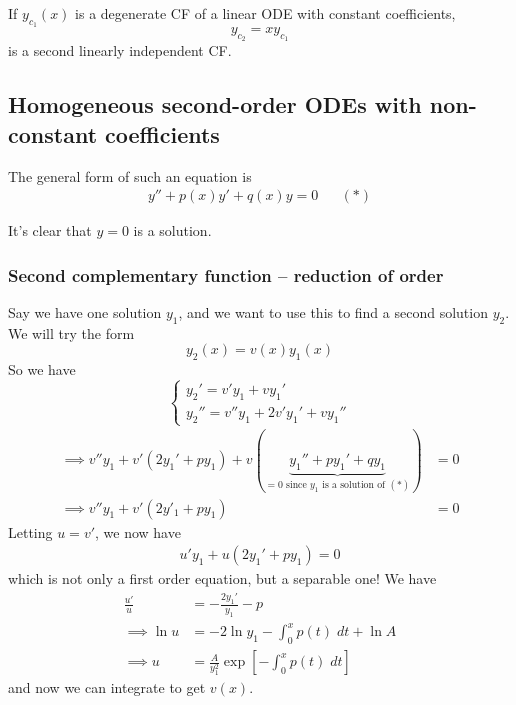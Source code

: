 \documentclass{../../template/note}
\begin{document}
    \begin{proposition}
        If \(y_{c_1}(x)\) is a degenerate CF of a linear ODE with constant coefficients,
        \[
            y_{c_2} = xy_{c_1}
        \]
        is a second linearly independent CF.
    \end{proposition}
    
    
    

    \subsection{Homogeneous second-order ODEs with non-constant coefficients}

    The general form of such an equation is
    \begin{align*}
        y'' + p(x)y' + q(x)y = 0 && (*)   
    \end{align*}

    It's clear that \(y = 0\) is a solution.

    \subsubsection{Second complementary function -- reduction of order}

    Say we have one solution \(y_1\), and we want to use this to find a second solution \(y_2\). We will try the form
    \[
        y_2(x) = v(x)y_1(x)
    \]
    So we have
    \[
        \begin{cases}
            y_2' = v'y_1 + vy_1' \\
            y_2'' = v''y_1 + 2v'y_1' + vy_1''
        \end{cases}
    \]
    \begin{align*}
        \implies v''y_1 + v'(2y_1' + py_1) + v(\underbrace{y_1'' + py_1' + qy_1}_{=0 \text{ since } y_1 \text{ is a solution of } (*)}) &= 0 \\
        \implies v''y_1 + v'(2y'_1 + py_1) &= 0       
    \end{align*}
    Letting \(u = v'\), we now have
    \begin{align*}
        u'y_1 + u(2y_1' + py_1) = 0
    \end{align*}
    which is not only a first order equation, but a separable one! We have
    \begin{align*}
        \frac{u'}{u} &= -\frac{2y_1'}{y_1} - p \\
        \implies \ln u &= -2 \ln y_1 - \int_0^x p(t) \; dt + \ln A \\
        \implies u &= \frac{A}{y_1^2}\exp\left[-\int_0^x p(t) \; dt\right]
    \end{align*}
    and now we can integrate to get \(v(x)\).
    
\end{document}
